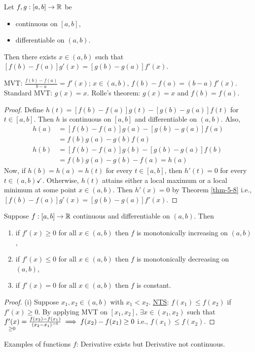 \documentclass[]{article}
\begin{document}
\begin{theorem}
	\label{thm-5-9}
	Let $f,g:[a,b]\rightarrow\mathbb{R}$ be
	\begin{itemize}
		\item continuous on $[a,b]$,
		\item differentiable on $(a,b)$.
	\end{itemize}
	Then there exists $x\in(a,b)$ such that $[f(b)-f(a)]g'(x) = [g(b)-g(a)]f'(x)$.
\end{theorem}
\begin{remark}
	MVT: $\frac{f(b)-f(a)}{b-a} = f'(x)$; $x\in(a,b)$, $f(b)-f(a)=(b-a)f'(x)$.
	Standard MVT: $g(x) = x$.
	Rolle's theorem: $g(x) = x$ and $f(b)=f(a)$.
\end{remark}
\begin{proof}
	Define $h(t) = [f(b)-f(a)]g(t) - [g(b)-g(a)]f(t)$ for $t\in[a,b]$.
	Then $h$ is continuous on $[a,b]$ and differentiable on $(a,b)$.
	Also,
	\begin{align*}
		h(a) &= [f(b)-f(a)]g(a) - [g(b)-g(a)]f(a) \\
			 &= f(b)g(a)-g(b)f(a) \\
		h(b) &= [f(b)-f(a)]g(b) - [g(b)-g(a)]f(b) \\
			 &= f(b)g(a) - g(b)-f(a) = h(a)
	\end{align*}
	Now, if $h(b)=h(a)=h(t)$ for every $t\in[a,b]$, then $h'(t)=0$ for every $t\in(a,b) \checkmark$.
	Otherwise, $h(t)$ attains either a local maximum or a local minimum at some point $x\in(a,b)$.
	Then $h'(x) = 0$ by Theorem \ref{thm-5-8} i.e., $[f(b)-f(a)]g'(x) = [g(b)-g(a)]f'(x)$.
\end{proof}

\begin{theorem}
	\label{thm-5-11}
	Suppose $f:[a,b]\rightarrow\mathbb{R}$ continuous and differentiable on $(a,b)$. Then
	\begin{enumerate}
		\item[(i)] if $f'(x)\geq0$ for all $x\in(a,b)$ then $f$ is monotonically increasing on $(a,b)$,
		\item[(ii)] if $f'(x)\leq0$ for all $x\in(a,b)$ then $f$ is monotonically decreasing on $(a,b)$,
		\item[(iii)] if $f'(x)=0$ for all $x\in(a,b)$ then $f$ is constant. 
	\end{enumerate}
\end{theorem}
\begin{proof}
	(i) Suppose $x_1,x_2\in(a,b)$ with $x_1<x_2$.
	\ul{\ul{NTS}}: $f(x_1)\leq f(x_2)$ if \ul{$f'(x)\geq0$}.
	By applying MVT on $[x_1,x_2]$, $\exists x\in(x_1,x_2)$ such that $\underset{\geq0}{f'(x)} = \frac{f(x_2)-f(x_1)}{(x_2-x_1)^{>0}} \implies f(x_2)-f(x_1)\geq0$ i.e., $f(x_1)\leq f(x_2)$.
\end{proof}
\begin{example}
	Examples of functions $f$: Derivative exists but Derivative not continuous.
\end{example}
\end{document}
